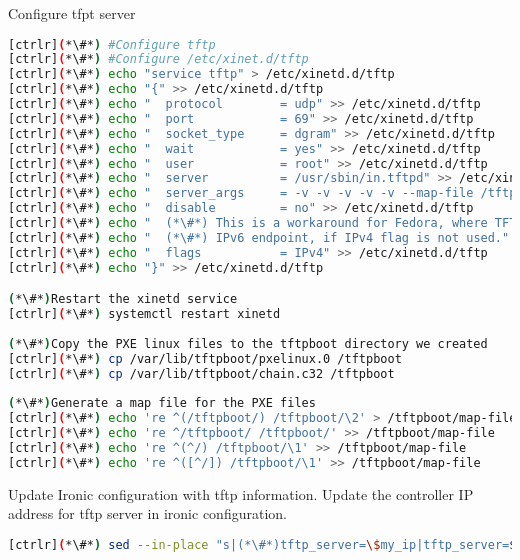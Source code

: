 Configure tfpt server


\begin{lstlisting}[language=bash,keywords={}]
[ctrlr](*\#*) #Configure tftp 
[ctrlr](*\#*) #Configure /etc/xinet.d/tftp
[ctrlr](*\#*) echo "service tftp" > /etc/xinetd.d/tftp
[ctrlr](*\#*) echo "{" >> /etc/xinetd.d/tftp
[ctrlr](*\#*) echo "  protocol        = udp" >> /etc/xinetd.d/tftp
[ctrlr](*\#*) echo "  port            = 69" >> /etc/xinetd.d/tftp
[ctrlr](*\#*) echo "  socket_type     = dgram" >> /etc/xinetd.d/tftp
[ctrlr](*\#*) echo "  wait            = yes" >> /etc/xinetd.d/tftp
[ctrlr](*\#*) echo "  user            = root" >> /etc/xinetd.d/tftp
[ctrlr](*\#*) echo "  server          = /usr/sbin/in.tftpd" >> /etc/xinetd.d/tftp
[ctrlr](*\#*) echo "  server_args     = -v -v -v -v -v --map-file /tftpboot/map-file /tftpboot" >> /etc/xinetd.d/tftp
[ctrlr](*\#*) echo "  disable         = no" >> /etc/xinetd.d/tftp
[ctrlr](*\#*) echo "  (*\#*) This is a workaround for Fedora, where TFTP will listen only on" >> /etc/xinetd.d/tftp
[ctrlr](*\#*) echo "  (*\#*) IPv6 endpoint, if IPv4 flag is not used." >> /etc/xinetd.d/tftp
[ctrlr](*\#*) echo "  flags           = IPv4" >> /etc/xinetd.d/tftp
[ctrlr](*\#*) echo "}" >> /etc/xinetd.d/tftp

(*\#*)Restart the xinetd service
[ctrlr](*\#*) systemctl restart xinetd
    
(*\#*)Copy the PXE linux files to the tftpboot directory we created
[ctrlr](*\#*) cp /var/lib/tftpboot/pxelinux.0 /tftpboot
[ctrlr](*\#*) cp /var/lib/tftpboot/chain.c32 /tftpboot
    
(*\#*)Generate a map file for the PXE files
[ctrlr](*\#*) echo 're ^(/tftpboot/) /tftpboot/\2' > /tftpboot/map-file
[ctrlr](*\#*) echo 're ^/tftpboot/ /tftpboot/' >> /tftpboot/map-file
[ctrlr](*\#*) echo 're ^(^/) /tftpboot/\1' >> /tftpboot/map-file
[ctrlr](*\#*) echo 're ^([^/]) /tftpboot/\1' >> /tftpboot/map-file
\end{lstlisting} 


	Update Ironic configuration with tftp information. Update the controller IP address for tftp server in ironic configuration.


\begin{lstlisting}[language=bash,keywords={}]
[ctrlr](*\#*) sed --in-place "s|(*\#*)tftp_server=\$my_ip|tftp_server=${controller_ip}|" /etc/ironic/ironic.conf
\end{lstlisting} 

